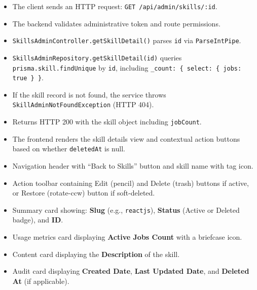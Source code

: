 \begin{itemize}[leftmargin=1.6em,topsep=3pt,itemsep=2pt,parsep=0pt,label=$\bullet$]
    \item The client sends an HTTP request: \texttt{GET /api/admin/skills/:id}.
    \item The backend validates administrative token and route permissions.
    \item \texttt{SkillsAdminController.getSkillDetail()} parses \texttt{id} via \texttt{ParseIntPipe}.
    \item \texttt{SkillsAdminRepository.getSkillDetail(id)} queries \texttt{prisma.skill.findUnique} by \texttt{id}, including \texttt{\_count: \{ select: \{ jobs: true \} \}}.
    \item If the skill record is not found, the service throws \texttt{SkillAdmin\-Not\-Found\-Exception} (HTTP 404).
    \item Returns HTTP 200 with the skill object including \texttt{jobCount}.
    \item The frontend renders the skill details view and contextual action buttons based on whether \texttt{deletedAt} is null.
\end{itemize}

\begin{itemize}[leftmargin=1.6em,topsep=3pt,itemsep=2pt,parsep=0pt,label=$\bullet$]
    \item Navigation header with ``Back to Skills'' button and skill name with tag icon.
    \item Action toolbar containing Edit (pencil) and Delete (trash) buttons if active, or Restore (rotate-ccw) button if soft-deleted.
    \item Summary card showing: \textbf{Slug} (e.g., \texttt{reactjs}), \textbf{Status} (Active or Deleted badge), and \textbf{ID}.
    \item Usage metrics card displaying \textbf{Active Jobs Count} with a briefcase icon.
    \item Content card displaying the \textbf{Description} of the skill.
    \item Audit card displaying \textbf{Created Date}, \textbf{Last Updated Date}, and \textbf{Deleted At} (if applicable).
\end{itemize}


